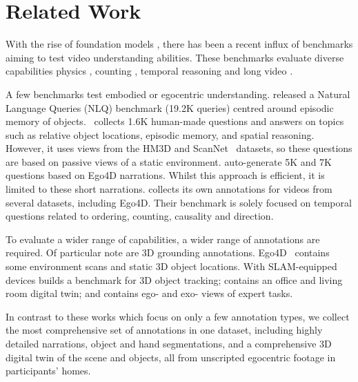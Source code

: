 \section{Related Work}
\vspace{-0.3em}

With the rise of foundation models \cite{radford2021learning,singh2022flava,alayrac2022flamingo,wang2023internimage,zhang2023video,achiam2023gpt,chen2024internvl,xiao2024florence,dubey2024llama,cheng2024videollama}, there has been a recent influx of %
benchmarks \cite{zhao2024videoniah, kesen2023vilma,mangalam2023egoschema,patraucean2023perception,li2024vitatecs,li2024seed,li2024mvbench,wang2024sok,chen2024rextime,fang2024mmbench,cai2024temporalbench,cores2024tvbench,Video-MME} aiming to test video understanding abilities. 
These benchmarks evaluate diverse  capabilities \eg physics \cite{patraucean2023perception}, counting \cite{fang2024mmbench}, temporal reasoning  \cite{cai2024temporalbench,chen2024rextime} and long video \cite{mangalam2023egoschema,Video-MME,fang2024mmbench}.


A few benchmarks test embodied or egocentric understanding. 
\cite{Ego4D2022CVPR} released a Natural Language Queries (NLQ) benchmark (19.2K queries) centred around episodic memory of objects.
\cite{OpenEQA2023}~collects 1.6K human-made questions and answers on topics such as relative object locations, episodic memory, and spatial reasoning. However, it uses views from the HM3D \cite{ramakrishnan2021habitat} and ScanNet~\cite{dai2017scannet} datasets, so these questions are based on passive views of a static environment. \cite{mangalam2023egoschema, ye2024mm} auto-generate 5K and 7K questions based on Ego4D narrations. Whilst this approach is efficient, it is limited to these short narrations.
\cite{cai2024temporalbench} collects its own annotations for videos from several datasets, including Ego4D. %
Their benchmark is solely focused on temporal questions related to ordering, counting, causality and direction.


To evaluate a wider range of capabilities, a wider range of annotations are required. 
Of particular note are 3D grounding annotations.
Ego4D~\cite{Ego4D2022CVPR} contains some environment scans and static 3D object locations. With SLAM-equipped devices \cite{zhao2024instance} builds a benchmark for 3D object tracking; \cite{pan2023aria} contains an office and living room digital twin; and \cite{EgoExo4d} contains ego- and exo- views of expert tasks.

In contrast to these works which focus on only a few annotation types, we collect the most comprehensive set of annotations in one dataset, including highly detailed narrations, object and hand segmentations, and a comprehensive 3D digital twin of the scene and objects, all from unscripted egocentric footage in participants' homes. 



\vspace{-0.5em}